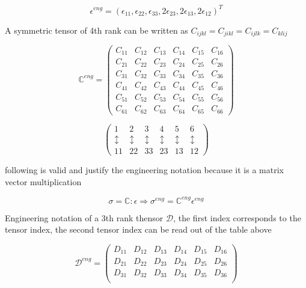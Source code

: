 	$$\epsilon^{eng} = (\epsilon_{11},\epsilon_{22},\epsilon_{33},2\epsilon_{23},2\epsilon_{13},2\epsilon_{12} )^T$$	
	
	A symmetric tensor of 4th rank can be written as $C_{ijkl} = C_{jikl} = C_{ijlk} = C_{klij} $
	
	$$\mathbb{C}^{eng}= \begin{pmatrix}
			C_{11}&C_{12}&C_{13}&C_{14}&C_{15}&C_{16}\\
			C_{21}&C_{22}&C_{23}&C_{24}&C_{25}&C_{26}\\
			C_{31}&C_{32}&C_{33}&C_{34}&C_{35}&C_{36}\\
			C_{41}&C_{42}&C_{43}&C_{44}&C_{45}&C_{46}\\
			C_{51}&C_{52}&C_{53}&C_{54}&C_{55}&C_{56}\\
			C_{61}&C_{62}&C_{63}&C_{64}&C_{65}&C_{66}
		\end{pmatrix}$$
	
		$$\begin{pmatrix}
			1&2&3&4&5&6\\
			\updownarrow&\updownarrow&\updownarrow&\updownarrow&\updownarrow&\updownarrow\\
			11&22&33&23&13&12
		\end{pmatrix}$$
	
	following is valid and justify the engineering notation because it is a matrix vector multiplication
	
	$$\sigma = \mathbb{C} : \epsilon \Rightarrow \sigma^{eng} = \mathbb{C}^{eng}\epsilon^{eng}$$

	Engineering notation of a 3th rank thensor $\mathcal{D}$, the first index corresponds to the tensor index, the second tensor index can be read out of the table above
	
	$$\mathcal{D}^{eng}= \begin{pmatrix}
		D_{11}&D_{12}&D_{13}&D_{14}&D_{15}&D_{16}\\
		D_{21}&D_{22}&D_{23}&D_{24}&D_{25}&D_{26}\\
		D_{31}&D_{32}&D_{33}&D_{34}&D_{35}&D_{36}\\
	\end{pmatrix}$$
		

